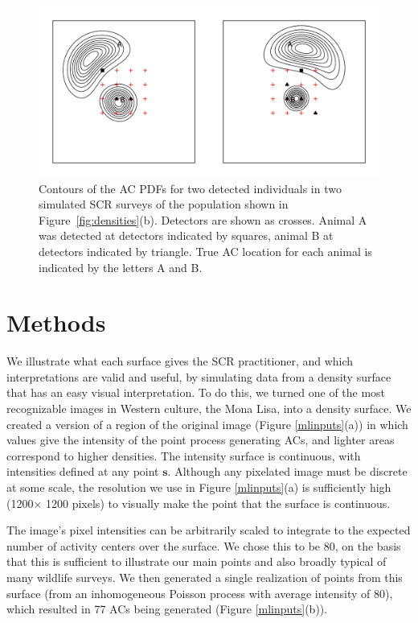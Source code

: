 \documentclass[useAMS,usenatbib,referee]{biom}
\begin{document}
\begin{figure}[htbp]
\centering
\includegraphics[width=\textwidth]{screrr.pdf}
\caption{Contours of the AC PDFs for two detected individuals in two simulated SCR surveys of the population shown in Figure~\ref{fig:densities}(b). Detectors are shown as crosses. Animal A was detected at detectors indicated by squares, animal B at detectors indicated by triangle. True AC location for each animal is indicated by the letters A and B.}
\label{fig:screrr}
\end{figure}

\section{Methods}

We illustrate what each surface gives the SCR practitioner, and which interpretations are valid and useful, by simulating data from a density surface that has an easy visual interpretation. To do this, we turned one of the most recognizable images in Western culture, the Mona Lisa, into a density surface. We created a version of a region of the original image (Figure \ref{mlinputs}(a)) in which values give the intensity of the point process generating ACs, and lighter areas correspond to higher densities. The intensity surface is continuous, with intensities defined at any point $\bm{s}$. Although any pixelated image must be discrete at some scale, the resolution we use in Figure \ref{mlinputs}(a) is sufficiently high (1200$\times$ 1200 pixels) to visually make the point that the surface is continuous.  

The image's pixel intensities can be arbitrarily scaled to integrate to the expected number of activity centers over the surface. We chose this to be 80, on the basis that this is sufficient to illustrate our main points and also broadly typical of many wildlife surveys. We then generated a single realization of points from this surface (from an inhomogeneous Poisson process with average intensity of 80), which resulted in 77 ACs being generated (Figure \ref{mlinputs}(b)).
\end{document}
